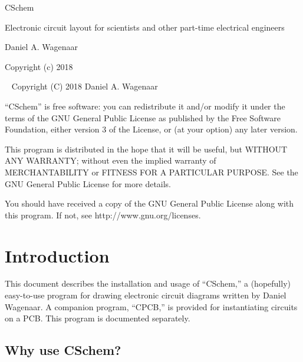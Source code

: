 \documentclass[11pt]{report}
\begin{document}
\thispagestyle{empty}
\begin{centering}
  {\Huge CSchem}
  \vskip30pt

  {\large Electronic circuit layout for scientists and other part-time electrical engineers}
  \vskip60pt

  {\large Daniel A. Wagenaar}
  \vfill
  
  {Copyright (c) 2018}
  
\end{centering}
\pagebreak
~
\vfill
\noindent Copyright (C) 2018 Daniel A. Wagenaar\medskip

``CSchem'' is free software: you can redistribute it and/or modify
it under the terms of the GNU General Public License as published by
the Free Software Foundation, either version 3 of the License, or
(at your option) any later version.

This program is distributed in the hope that it will be useful,
but WITHOUT ANY WARRANTY; without even the implied warranty of
MERCHANTABILITY or FITNESS FOR A PARTICULAR PURPOSE.  See the
GNU General Public License for more details.

You should have received a copy of the GNU General Public License
along with this program.  If not, see http://www.gnu.org/licenses.
\pagebreak

\chapter{Introduction}

This document describes the installation and usage of ``CSchem,'' a
(hopefully) easy-to-use program for drawing electronic circuit
diagrams written by Daniel Wagenaar. A companion program, ``CPCB,''
is provided for instantiating circuits on a PCB. This program is
documented separately.

\section{Why use CSchem?}
\end{document}
